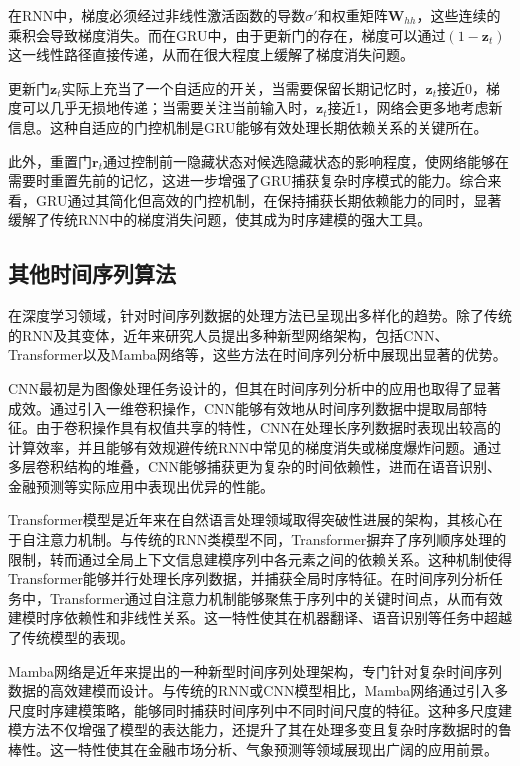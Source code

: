 在RNN中，梯度必须经过非线性激活函数的导数$\sigma'$和权重矩阵$\mathbf{W}_{hh}$，这些连续的乘积会导致梯度消失。而在GRU中，由于更新门的存在，梯度可以通过$(1 - \mathbf{z}_t)$这一线性路径直接传递，从而在很大程度上缓解了梯度消失问题。

更新门$\mathbf{z}_t$实际上充当了一个自适应的开关，当需要保留长期记忆时，$\mathbf{z}_t$接近0，梯度可以几乎无损地传递；当需要关注当前输入时，$\mathbf{z}_t$接近1，网络会更多地考虑新信息。这种自适应的门控机制是GRU能够有效处理长期依赖关系的关键所在。

此外，重置门$\mathbf{r}_t$通过控制前一隐藏状态对候选隐藏状态的影响程度，使网络能够在需要时重置先前的记忆，这进一步增强了GRU捕获复杂时序模式的能力。综合来看，GRU通过其简化但高效的门控机制，在保持捕获长期依赖能力的同时，显著缓解了传统RNN中的梯度消失问题，使其成为时序建模的强大工具。
\subsection{其他时间序列算法}
在深度学习领域，针对时间序列数据的处理方法已呈现出多样化的趋势。除了传统的RNN及其变体，近年来研究人员提出多种新型网络架构，包括CNN、Transformer以及Mamba网络等，这些方法在时间序列分析中展现出显著的优势。

CNN最初是为图像处理任务设计的，但其在时间序列分析中的应用也取得了显著成效\cite{lecun1998gradient}。通过引入一维卷积操作，CNN能够有效地从时间序列数据中提取局部特征。由于卷积操作具有权值共享的特性，CNN在处理长序列数据时表现出较高的计算效率，并且能够有效规避传统RNN中常见的梯度消失或梯度爆炸问题。通过多层卷积结构的堆叠，CNN能够捕获更为复杂的时间依赖性，进而在语音识别、金融预测等实际应用中表现出优异的性能\cite{li2021survey}。

Transformer模型是近年来在自然语言处理领域取得突破性进展的架构，其核心在于自注意力机制\cite{Vaswanietal2017Attention}。与传统的RNN类模型不同，Transformer摒弃了序列顺序处理的限制，转而通过全局上下文信息建模序列中各元素之间的依赖关系。这种机制使得Transformer能够并行处理长序列数据，并捕获全局时序特征。在时间序列分析任务中，Transformer通过自注意力机制能够聚焦于序列中的关键时间点，从而有效建模时序依赖性和非线性关系。这一特性使其在机器翻译、语音识别等任务中超越了传统模型的表现。

Mamba网络是近年来提出的一种新型时间序列处理架构，专门针对复杂时间序列数据的高效建模而设计\cite{gu2024mamba}。与传统的RNN或CNN模型相比，Mamba网络通过引入多尺度时序建模策略，能够同时捕获时间序列中不同时间尺度的特征。这种多尺度建模方法不仅增强了模型的表达能力，还提升了其在处理多变且复杂时序数据时的鲁棒性。这一特性使其在金融市场分析、气象预测等领域展现出广阔的应用前景。

